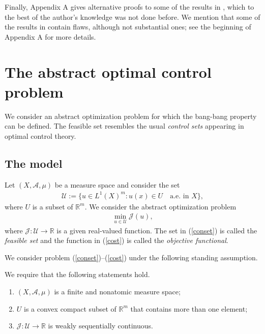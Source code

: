 \documentclass[hidelinks,onefignum,onetabnum]{siamart220329}
\begin{document}
Finally,  Appendix A  gives  alternative proofs to some  of the results in \cite{Visin}, which to the best of the author's knowledge was not done before. We mention that some of the results in \cite{Visin} contain flaws, although not substantial ones; see the beginning  of  Appendix  A for more details.

\section{The abstract optimal control problem}\label{S2}


We consider an abstract optimization problem for which the bang-bang property can be defined. The feasible set resembles the usual \textit{control sets} appearing in optimal control theory. 


\subsection{The model}
Let  $(X,\mathcal A,\mu)$ be a measure space and consider the set
\begin{align}\label{conset}
	\mathcal U := \{u \in {L^1(X)^m} : u(x)\in  U\quad \text{a.e.~in } X\},
\end{align}
where $U$ is a subset of $\mathbb R^m$. We consider the abstract optimization problem
\begin{align}\label{cost}
	\min_{u\in\mathcal U}\mathcal J(u),
\end{align}
where $\mathcal J:\mathcal U\to\mathbb R$ is a given real-valued function.  The set in (\ref{conset}) is called the \textit{feasible set}  and the function in (\ref{cost}) is called the \textit{objective functional}.

We consider problem (\ref{conset})--(\ref{cost}) under the following standing assumption.

\begin{assumption}\label{standingass}
	We require that the following statements hold.
		\begin{enumerate}
			\item $(X,\mathcal A,\mu)$ is a finite and nonatomic measure space;
			
			\item $U$ is a convex compact subset of $ \mathbb R^m$ that contains more than one element;
			
			\item $\mathcal J:\mathcal U\to\mathbb R$ is weakly sequentially continuous.
		\end{enumerate}
\end{assumption}
\end{document}

